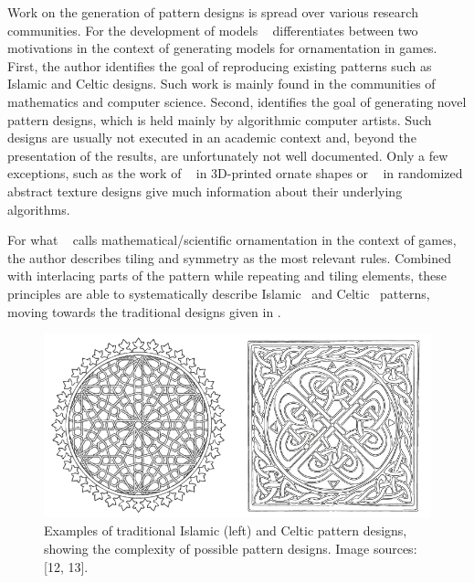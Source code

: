 Work on the generation of pattern designs is spread over various research communities. For the development of models \citeauthor*{whitehead_2010_tpd}~\cite{whitehead_2010_tpd} differentiates between two motivations in the context of generating models for ornamentation in games. First, the author identifies the goal of reproducing existing patterns such as Islamic and Celtic designs. Such work is mainly found in the communities of mathematics and computer science. Second, \citeauthor*{whitehead_2010_tpd} identifies the goal of generating novel pattern designs, which is held mainly by algorithmic computer artists. Such designs are usually not executed in an academic context and, beyond the presentation of the results, are unfortunately not well documented. Only a few exceptions, such as the work of \citeauthor*{takayama_2016_med}~\cite{takayama_2016_med} in 3D-printed ornate shapes or \citeauthor*{alvarez_2019_ido}~\cite{alvarez_2019_ido} in randomized abstract texture designs give much information about their underlying algorithms.

For what \citeauthor*{whitehead_2010_tpd}~\cite{whitehead_2010_tpd} calls mathematical/scientific ornamentation in the context of games, the author describes tiling and symmetry as the most relevant rules. Combined with interlacing parts of the pattern while repeating and tiling elements, these principles are able to systematically describe Islamic~\cite{ostromoukhov_1998_mtc} and Celtic~\cite{cromwell_1993_ckm} patterns, moving towards the traditional designs given in .

\begin{figure}
\centering
    \includegraphics[width=0.9\columnwidth]{figures/islamic_celtic_ornament_01.png}
    \caption[Islamic and Celtic pattern designs]{\label{fig:islamic_celtic_ornament}Examples of traditional Islamic (left) and Celtic pattern designs, showing the complexity of possible pattern designs. Image sources: [12, 13].} 
\end{figure}

